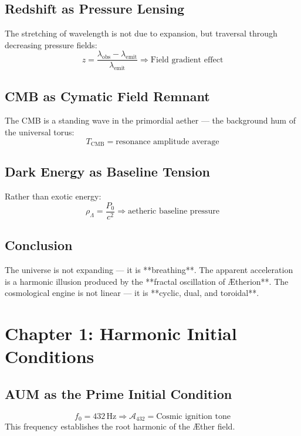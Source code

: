 \documentclass[12pt]{book}
\begin{document}
\subsection*{Redshift as Pressure Lensing}
The stretching of wavelength is not due to expansion, but traversal through decreasing pressure fields:
\[
z = \frac{\lambda_{\text{obs}} - \lambda_{\text{emit}}}{\lambda_{\text{emit}}} \Rightarrow \text{Field gradient effect}
\]

\subsection*{CMB as Cymatic Field Remnant}
The CMB is a standing wave in the primordial aether — the background hum of the universal torus:
\[
T_{\text{CMB}} = \text{resonance amplitude average}
\]

\subsection*{Dark Energy as Baseline Tension}
Rather than exotic energy:
\[
\rho_{\Lambda} = \frac{P_0}{c^2} \Rightarrow \text{aetheric baseline pressure}
\]

\subsection*{Conclusion}
The universe is not expanding — it is **breathing**. The apparent acceleration is a harmonic illusion produced by the **fractal oscillation of Ætherion**. The cosmological engine is not linear — it is **cyclic, dual, and toroidal**.







\maketitle

\section*{Chapter 1: Harmonic Initial Conditions}

\subsection*{AUM as the Prime Initial Condition}
\[
f_0 = 432\,\text{Hz} \Rightarrow \mathcal{A}_{432} = \text{Cosmic ignition tone}
\]
This frequency establishes the root harmonic of the Æther field.
\end{document}
